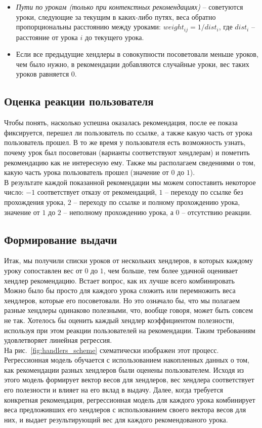 \documentclass[14pt]{matmex-diploma}
\begin{document}
\begin{itemize}
    \item \textit{Пути по урокам (только при контекстных рекомендациях)} -- советуются уроки, следующие за текущим в каких-либо путях, веса обратно пропорциональны расстоянию между уроками: $weight_{ij} = 1 / dist_{i}$, где $dist_i$ -- расстояние от урока $i$ до текущего урока.
    \item Если все предыдущие хендлеры в совокупности посоветовали меньше уроков, чем было нужно, в рекомендации добавляются случайные уроки, вес таких уроков равняется $0$.
\end{itemize}


\subsection{Оценка реакции пользователя}
\indent Чтобы понять, насколько успешна оказалась рекомендация, после ее показа фиксируется, перешел ли пользователь по ссылке, а также какую часть от урока пользователь прошел. В то же время у пользователя есть возможность узнать, почему урок был посоветован (варианты соответствуют хендлерам) и пометить рекомендацию как не интересную ему. Также мы располагаем сведениями о том, какую часть урока пользователь прошел (значение от $0$ до $1$).
\\\indent В результате каждой показанной рекомендации мы можем сопоставить некоторое число: $-1$ соответствует отказу от рекомендаций, $1$ -- переходу по ссылке без прохождения урока, $2$ -- переходу по ссылке и полному прохождению урока, значение от $1$ до $2$ -- неполному прохождению урока, а $0$ -- отсутствию реакции.


\subsection{Формирование выдачи}
\indent Итак, мы получили списки уроков от нескольких хендлеров, в которых каждому уроку сопоставлен вес от $0$ до $1$, чем больше, тем более удачной оценивает хендлер рекомендацию. Встает вопрос, как их лучше всего комбинировать
\\\indent Можно было бы просто для каждого урока сложить или перемножить веса хендлеров, которые его посоветовали. Но это означало бы, что мы полагаем разные хендлеры одинаково полезными, что, вообще говоря, может быть совсем не так. Хотелось бы оценить каждый хендлер коэффициентом полезности, используя при этом реакции пользователей на рекомендации. Таким требованиям удовлетворяет линейная регрессия.
\\\indent На рис.~\ref{fig:handlers_scheme} схематически изображен этот процесс. Регрессионная модель обучается с использованием накопленных данных о том, как рекомендации разных хендлеров были оценены пользователем. Исходя из этого модель формирует вектор весов для хендлеров, вес хендлера соответствует его полезности и влияет на его вклад в выдачу. Далее, когда требуется конкретная рекомендация, регрессионная модель для каждого урока комбинирует веса предложивших его хендлеров с использованием своего вектора весов для них, и выдает результирующий вес для каждого рекомендованого урока.
\end{document}
